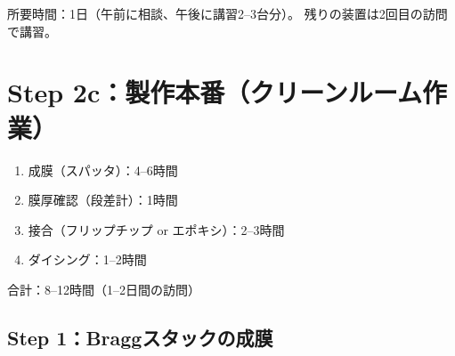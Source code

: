 \documentclass[11pt,a4paper]{article}
\def\textbf#1{#1}%
\begin{document}
\textbf{所要時間}：1日（午前に相談、午後に講習2--3台分）。
残りの装置は2回目の訪問で講習。


\section{Step 2c：製作本番（クリーンルーム作業）}

\begin{tcolorbox}[colback=yellow!5,colframe=yellow!60!black,title=作業フロー（1--2日間）]
\begin{enumerate}[leftmargin=*]
\item 成膜（スパッタ）：4--6時間
\item 膜厚確認（段差計）：1時間
\item 接合（フリップチップ or エポキシ）：2--3時間
\item ダイシング：1--2時間
\end{enumerate}
合計：8--12時間（1--2日間の訪問）
\end{tcolorbox}

\subsection{Step 1：Braggスタックの成膜}
\end{document}
